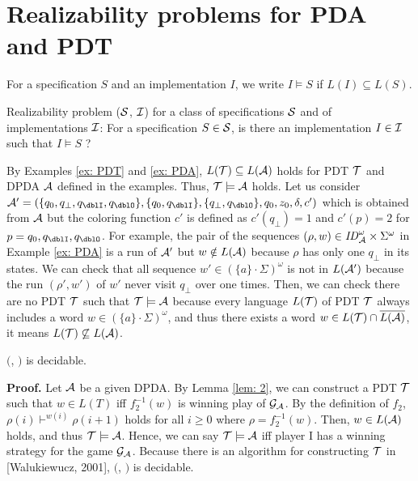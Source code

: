 \section{Realizability problems for PDA and PDT}

For a specification $S$ and an implementation $I$,
we write $I \models S$ if $L(I) \subseteq L(S)$.

\begin{definition}
Realizability problem \Real (${\cal S}$, ${\cal I}$) for a class of specifications ${\cal S}$ and of implementations ${\cal I}$: For a specification $S\in{\cal S}$, is there an implementation $I\in{\cal I}$ such that $I \models S$ ?
\end{definition}

\begin{example}
By Examples \ref{ex: PDT} and \ref{ex: PDA},
$L({\cal T})\subseteq L({\cal A})$ holds for PDT ${\cal T}$ and DPDA ${\cal A}$
defined in the examples.
Thus, ${\cal T}\models{\cal A}$ holds.
Let us consider $\calA'=(\{q_0,q_\bot,q_\dblI,q_\dblO\}, \{q_0,q_\dblI\}, \{q_\bot,q_\dblO\},q_0,z_0,\delta,c')$
which is obtained from ${\cal A}$ but the coloring function $c'$
is defined as $c'(q_\bot)=1$ and $c'(p)=2$ for $p=q_0,q_\dblI,q_\dblO$.
For example, the pair of the sequences
$(\rho,w)\in\mathit{ID}_{\cal A}^\omega\times \Sigma^\omega$
in Example \ref{ex: PDA}
is a run of ${\cal A}'$ but $w\notin L({\cal A})$ because
$\rho$ has only one $q_\bot$ in its states.
We can check that all sequence $w'\in (\{a\}\cdot\Sigma)^\omega$
is not in $L({\cal A}')$ because
the run $(\rho',w')$ of $w'$ never visit $q_\bot$ over one times.
Then, we can check there are no PDT ${\cal T}$ such that ${\cal T}\models{\cal A}$
because every language $L({\cal T})$ of PDT ${\cal T}$
always includes a word $w\in (\{a\}\cdot\Sigma)^\omega$,
and thus there exists a word $w\in L({\cal T})\cap \overline{L({\cal A})}$, it means $L({\cal T})\not\subseteq L({\cal A})$.
\end{example}

\begin{theorem}\label{the: DPDA}
\Real $($\DPDA, \PDT$)$ is decidable.
\end{theorem}
{\bf Proof.}\quad
Let ${\cal A}$ be a given DPDA.
By Lemma \ref{lem: 2},
we can construct a PDT ${\cal T}$ such that
$w\in L(T)$ iff $f^{-1}_2(w)$ is winning play of ${\cal G}_{\cal A}$.
By the definition of $f_2$,
$\rho(i)\vdash^{w(i)} \rho(i+1)$ holds
for all $i\geq 0$ where $\rho=f^{-1}_2(w)$.
Then, $w\in L({\cal A})$ holds, and thus ${\cal T}\models{\cal A}$.
Hence, we can say ${\cal T}\models{\cal A}$ iff player I has a winning strategy for the game ${\cal G}_{\cal A}$.
Because there is an algorithm for constructing ${\cal T}$
in [Walukiewucz, 2001], \Real $($\DPDA, \PDT$)$ is decidable.

